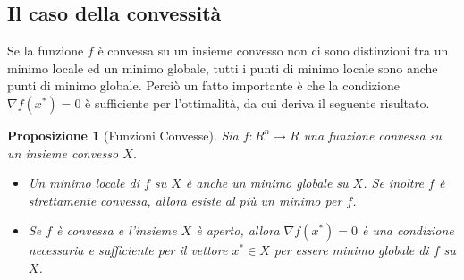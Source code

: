 \documentclass[a4paper, 12pt]{article}
\newtheorem{prop}{Proposizione}
\begin{document}
\subsection{Il caso della convessità}
Se la funzione $f$ è convessa su un insieme convesso non ci sono distinzioni tra un minimo locale ed un minimo globale, tutti i punti di minimo locale sono anche punti di minimo globale. Perciò un fatto importante è che la condizione $\nabla f(x^\ast) = 0$ è sufficiente per l'ottimalità, da cui deriva il seguente risultato.
\begin{prop}[Funzioni Convesse] Sia $f:R^n \to R$ una funzione convessa su un insieme convesso $X$.
\begin{itemize}
  \item Un minimo locale di $f$ su $X$ è anche un minimo globale su $X$. Se inoltre $f$ è strettamente convessa, allora esiste al più un minimo per $f$.
  \item Se $f$ è convessa e l'insieme $X$ è aperto, allora $\nabla f(x^\ast) = 0$ è una condizione necessaria e sufficiente per il vettore $x^\ast \in X$ per essere minimo globale di $f$ su $X$.
\end{itemize}
\end{prop}
\end{document}
